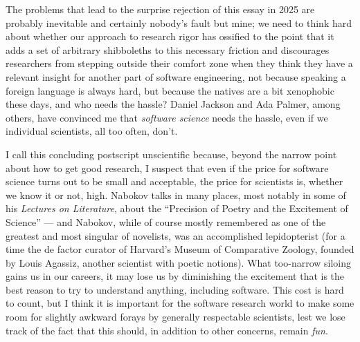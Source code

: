 \documentclass[sigplan,screen]{acmart}
\begin{document}
The problems that
lead to the surprise rejection of this essay in 2025 are probably inevitable
and certainly nobody's fault but mine; we need to think hard about whether our approach
to research rigor has ossified to the point that it adds a set of
arbitrary shibboleths to this necessary friction and discourages
researchers from stepping outside their comfort zone when
they think they have a relevant insight for another part of software engineering,
not because speaking a foreign language is always hard, but because
the natives are a bit xenophobic these days, and who needs the hassle?
Daniel Jackson and Ada Palmer, among others, have convinced me that
\emph{software science} needs the hassle, even if we individual scientists, all
too often, don't.

I call this concluding postscript unscientific because, beyond the
narrow point about how to get good research, I suspect that even if
the price for software science turns out to be small and acceptable,
the price for scientists is, whether we know it or not, high.  Nabokov
talks in many places, most notably in some of his \emph{Lectures on
  Literature}, about the ``Precision of Poetry and the Excitement of
Science'' --- and Nabokov, while of course mostly remembered as one of
the greatest and most singular of novelists, was an accomplished
lepidopterist (for a time the de factor curator of Harvard's Museum of
Comparative Zoology, founded by Louis Agassiz, another scientist with
poetic notions).  What too-narrow siloing gains us in our careers, it
may lose us by diminishing the excitement that is the best reason to try to
understand anything, including software.  This cost is hard to count,
but I think it is important for the software research world to make
some room for slightly awkward forays by generally respectable scientists, lest we lose track of the fact
that this should, in addition to other concerns, remain \emph{fun}.




\end{document}
